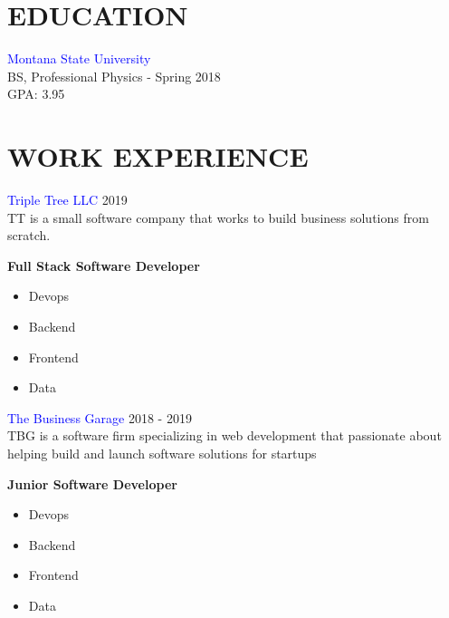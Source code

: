 \documentclass[12pt]{resume}
\begin{document}
    \begin{minipage}[t]{0.45\textwidth}

        {\section* {EDUCATION}}
        \textcolor{blue}{Montana State University} \\
        BS, Professional Physics - Spring 2018\\
        GPA: 3.95

        {\section* {WORK EXPERIENCE}}
        \textcolor{blue}{Triple Tree LLC} {\hfill 2019} \\
        TT is a small software company that works to build business
        solutions from scratch.
        \begin{spacing}{1.2}
            {\bf Full Stack Software Developer}
        \end{spacing}
        \vspace{-1mm}
        \begin{itemize}
            \setlength\itemsep{-.2em}
            \item {Devops}
            \item{Backend}
            \item{Frontend}
            \item {Data}
        \end{itemize}

        \textcolor{blue}{The Business Garage} {\hfill 2018 - 2019} \\
        TBG is a software firm specializing in web development
        that passionate about helping build and launch software solutions for
        startups
        \begin{spacing}{1.2}
            {\bf Junior Software Developer}
        \end{spacing}
        \vspace{-2mm}
        \begin{itemize}
            \setlength\itemsep{-.2em}
            \item {Devops}
            \item{Backend}
            \item{Frontend}
            \item {Data}
        \end{itemize}


\end{minipage}
\end{document}
